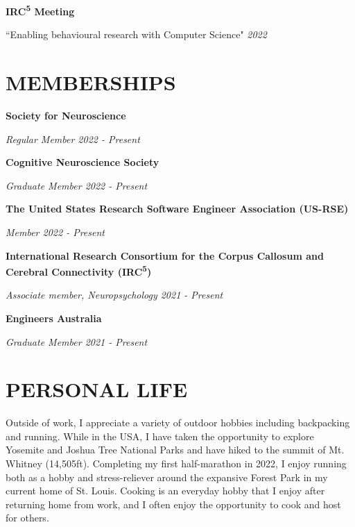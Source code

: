 \documentclass{article}
\begin{document}
  \medbreak

  \textbf{IRC\textsuperscript{5} Meeting}

  ``Enabling behavioural research with Computer Science" \hfill \textit{2022}

  \pagebreak

  \section*{\centering\uppercase{Memberships}}

  {\textbf{Society for Neuroscience}}

  \textit{Regular Member \hfill 2022 - Present}

  \medbreak

  {\textbf{Cognitive Neuroscience Society}}

  \textit{Graduate Member \hfill 2022 - Present}

  \medbreak

  {\textbf{The United States Research Software Engineer Association (US-RSE)}}

  \textit{Member \hfill 2022 - Present}

  \medbreak

  {\textbf{International Research Consortium for the Corpus Callosum and Cerebral Connectivity (IRC\textsuperscript{5})}}

  \textit{Associate member, Neuropsychology \hfill 2021 - Present}

  \medbreak

  {\textbf{Engineers Australia}}

  \textit{Graduate Member \hfill 2021 - Present}

  \section*{\centering\uppercase{Personal Life}}

  Outside of work, I appreciate a variety of outdoor hobbies including backpacking and running. While in the USA, I have taken the opportunity to explore Yosemite and Joshua Tree National Parks and have hiked to the summit of Mt. Whitney (14,505ft). Completing my first half-marathon in 2022, I enjoy running both as a hobby and stress-reliever around the expansive Forest Park in my current home of St. Louis. Cooking is an everyday hobby that I enjoy after returning home from work, and I often enjoy the opportunity to cook and host for others.
\end{document}
